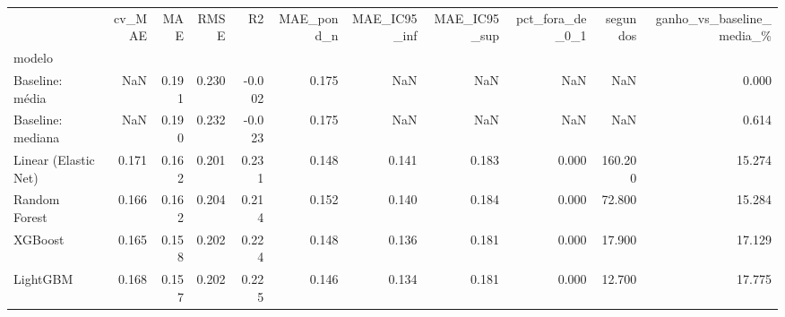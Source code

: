 \begin{tabular}{lrrrrrrrrrr}
\toprule
 & cv\_MAE & MAE & RMSE & R2 & MAE\_pond\_n & MAE\_IC95\_inf & MAE\_IC95\_sup & pct\_fora\_de\_0\_1 & segundos & ganho\_vs\_baseline\_media\_\% \\
modelo &  &  &  &  &  &  &  &  &  &  \\
\midrule
Baseline: média & NaN & 0.191 & 0.230 & -0.002 & 0.175 & NaN & NaN & NaN & NaN & 0.000 \\
Baseline: mediana & NaN & 0.190 & 0.232 & -0.023 & 0.175 & NaN & NaN & NaN & NaN & 0.614 \\
Linear (Elastic Net) & 0.171 & 0.162 & 0.201 & 0.231 & 0.148 & 0.141 & 0.183 & 0.000 & 160.200 & 15.274 \\
Random Forest & 0.166 & 0.162 & 0.204 & 0.214 & 0.152 & 0.140 & 0.184 & 0.000 & 72.800 & 15.284 \\
XGBoost & 0.165 & 0.158 & 0.202 & 0.224 & 0.148 & 0.136 & 0.181 & 0.000 & 17.900 & 17.129 \\
LightGBM & 0.168 & 0.157 & 0.202 & 0.225 & 0.146 & 0.134 & 0.181 & 0.000 & 12.700 & 17.775 \\
\bottomrule
\end{tabular}

